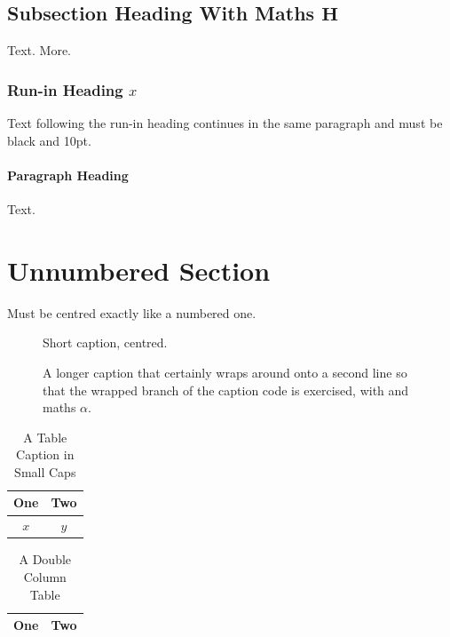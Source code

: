 \documentclass[journal,twoside,web]{ieeecomm}
\begin{document}
\subsection{Subsection Heading With Maths $\mathbf{H}$}
Text.  More.
\subsubsection{Run-in Heading $x$}
Text following the run-in heading continues in the same paragraph and must be black and 10pt.
\paragraph{Paragraph Heading}
Text.

\section*{Unnumbered Section}
Must be centred exactly like a numbered one.

\begin{figure}[!t]
\centering
{}
\caption{Short caption, centred.}
\label{fig:one}
\end{figure}

\begin{figure}[!t]
\centering
\subfloat[First]{\rule{1in}{0.75in}\label{fig:a}}
\hfil
\subfloat[Second]{\rule{1in}{0.75in}\label{fig:b}}
\caption{A longer caption that certainly wraps around onto a second line so that the wrapped branch of the caption code is exercised, with  and maths $\alpha$.}
\end{figure}

\begin{table}[!t]
\caption{A Table Caption in Small Caps}
\label{tab:one}
\centering
\begin{tabular}{c|c}
\hline
One & Two\\
\hline
$x$ & $y$\\
\hline
\end{tabular}
\end{table}

\begin{table}[!t]
\caption{A Double Column Table}
\centering
\begin{tabular}{c|c}
\hline
One & Two\\
\hline
\end{tabular}
\end{table}
\end{document}
